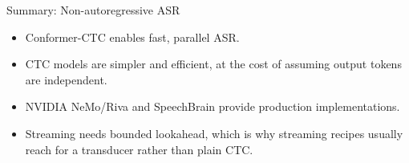 \begin{frame}{Summary: Non-autoregressive ASR}
    \begin{itemize}
        \setlength{\itemsep}{1.5em}
        \item Conformer-CTC enables fast, parallel ASR.
        \item CTC models are simpler and efficient, at the cost of assuming output tokens are independent.
        \item NVIDIA NeMo/Riva and SpeechBrain provide production implementations.
        \item Streaming needs bounded lookahead, which is why streaming recipes usually reach for a transducer rather than plain CTC.
    \end{itemize}
\end{frame}
